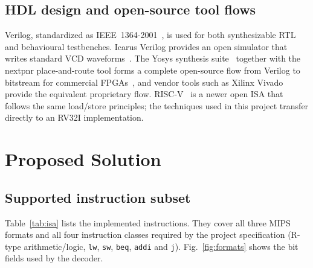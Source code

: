 \documentclass[conference]{IEEEtran}
\begin{document}
\subsection{HDL design and open-source tool flows}
Verilog, standardized as IEEE~1364-2001~\cite{ieee1364}, is used for both
synthesizable RTL and behavioural testbenches. Icarus Verilog provides an open
simulator that writes standard VCD waveforms~\cite{icarus}. The Yosys
synthesis suite~\cite{yosys} together with the nextpnr place-and-route tool
forms a complete open-source flow from Verilog to bitstream for commercial
FPGAs~\cite{shah2019yosys}, and vendor tools such as Xilinx Vivado provide the
equivalent proprietary flow. RISC-V~\cite{riscv2019} is a newer open ISA that
follows the same load/store principles; the techniques used in this project
transfer directly to an RV32I implementation.

\section{Proposed Solution}

\subsection{Supported instruction subset}
Table~\ref{tab:isa} lists the implemented instructions. They cover all three
MIPS formats and all four instruction classes required by the project
specification (R-type arithmetic/logic, \texttt{lw}, \texttt{sw},
\texttt{beq}, \texttt{addi} and \texttt{j}). Fig.~\ref{fig:formats} shows the
bit fields used by the decoder.

\begin{table}[!tbp]
\caption{Implemented MIPS32 instruction subset}
\label{tab:isa}
\centering
\footnotesize
{}
\end{table}
\end{document}
